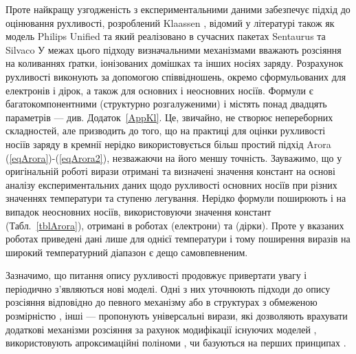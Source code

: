 \documentclass[fleqn,twoside,twocolumn,nofootinbib,showkeys]{revtex4} %
\begin{document}
Проте найкращу узгодженість з експериментальними даними забезпечує підхід до оцінювання рухливості,
розроблений Klaassen \cite{KLAASSEN953}, відомий у літературі також як модель Philips Unified та який реалізовано в сучасних пакетах Sentaurus та Silvaco
У межах цього підходу визначальними механізмами вважають розсіяння на коливаннях ґратки, іонізованих домішках та інших носіях заряду.
Розрахунок рухливості виконують за допомогою співвідношень, окремо сформульованих для електронів і дірок, а також для основних і неосновних носіїв.
Формули є багатокомпонентними (структурно розгалуженими) і містять понад двадцять параметрів --- див. Додаток~\ref{AppKl}.
Це, звичайно, не створює непереборних складностей, але призводить до того, що на практиці для оцінки рухливості носіїв заряду в кремнії нерідко використовується більш простий
підхід Arora (\ref{eqArora})-(\ref{eqArora2}), незважаючи на його меншу точність.
Зауважимо, що у оригінальній роботі \cite{Arora1982} вирази отримані та визначені значення констант
на основі аналізу експериментальних даних щодо рухливості основних носіїв при різних значеннях температури та ступеню легування.
Нерідко формули поширюють і на випадок неосновних носіїв, використовуючи значення констант (Табл.~\ref{tblArora}),
отримані в роботах \cite{Swirhun1986} (електрони) та \cite{Alamo1985} (дірки).
Проте у вказаних роботах приведені дані лише для однієї температури і тому поширення виразів на широкий температурний діапазон є дещо самовпевненим.

Зазначимо, що питання опису рухливості продовжує привертати увагу і періодично з'являються нові моделі.
Одні з них уточнюють підходи до опису розсіяння відповідно до певного механізму \cite{Rode2023} або в структурах з обмеженою розмірністю \cite{Sadi2019,Wang2020},
інші --- пропонують універсальні вирази, які дозволяють врахувати додаткові механізми розсіяння за рахунок модифікації існуючих моделей \cite{Abenante2023, Cummings2010, Wu2025},
використовують апроксимаційні поліноми \cite{NoorMohammad1993}, чи базуються на перших принципах \cite{Leveillee2023,Wu2016}.
\end{document}
